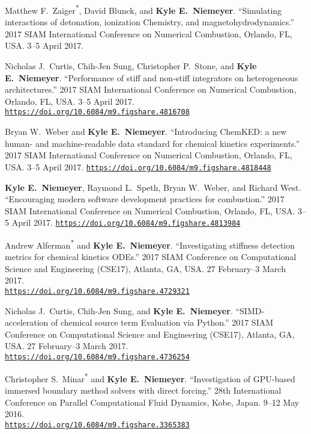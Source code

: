 \documentclass[margin,line,11pt]{res}
\makeatletter
\newlength{\bibhang}
\newlength{\bibsep}
 {\@listi \global\bibsep\itemsep \global\advance\bibsep by\parsep}
\newenvironment{bibenum*}
  {\renewcommand\labelenumi{\theenumi.}%
   \etaremune[
     topsep=0pt,
     itemsep=\bibsep,
     parsep=0pt,partopsep=0pt,
     itemindent=-\bibhang,
     leftmargin={\bibhang+\widthof{[999]}}]}
  {\endetaremune}
\newcommand*{\doi}[1]{\href{https://doi.org/#1}{\nolinkurl{https://doi.org/#1}}}
\newcommand*{\grad}[0]{\textsuperscript{*}}
\makeatother
\begin{document}
\begin{resume}
\begin{bibenum*}
\item Matthew F.~Zaiger\grad{}, David Blunck, and \textbf{Kyle E.~Niemeyer}.
``Simulating interactions of detonation, ionization Chemistry, and magnetohydrodynamics.''
2017 SIAM International Conference on Numerical Combustion, Orlando, FL, USA.
3--5 April 2017.

\item Nicholas J.~Curtis, Chih-Jen Sung, Christopher P.~Stone, and \textbf{Kyle E.~Niemeyer}.
``Performance of stiff and non-stiff integrators on heterogeneous architectures.''
2017 SIAM International Conference on Numerical Combustion, Orlando, FL, USA.
3--5 April 2017.
\doi{10.6084/m9.figshare.4816708}

\item Bryan W.~Weber and \textbf{Kyle E.~Niemeyer}.
``Introducing ChemKED: a new human- and machine-readable data standard for chemical kinetics experiments.''
2017 SIAM International Conference on Numerical Combustion, Orlando, FL, USA.
3--5 April 2017.
\doi{10.6084/m9.figshare.4818448}

\item \textbf{Kyle E.~Niemeyer}, Raymond L.~Speth, Bryan W.~Weber, and Richard West.
``Encouraging modern software development practices for combustion.''
2017 SIAM International Conference on Numerical Combustion, Orlando, FL, USA.
3--5 April 2017.
\doi{10.6084/m9.figshare.4813984}

\item Andrew Alferman\textsuperscript{*} and \textbf{Kyle E.~Niemeyer}.
``Investigating stiffness detection metrics for chemical kinetics ODEs.''
2017 SIAM Conference on Computational Science and Engineering (CSE17), Atlanta, GA, USA.
27 February--3 March 2017. \\
\doi{10.6084/m9.figshare.4729321}

\item Nicholas J.~Curtis, Chih-Jen Sung, and \textbf{Kyle E.~Niemeyer}.
``SIMD-acceleration of chemical source term Evaluation via Python.''
2017 SIAM Conference on Computational Science and Engineering (CSE17), Atlanta, GA, USA.
27 February--3 March 2017. \\
\doi{10.6084/m9.figshare.4736254}

\item Christopher S.~Minar\textsuperscript{*} and \textbf{Kyle E.~Niemeyer}.
``Investigation of GPU-based immersed boundary method solvers with direct forcing.''
28th International Conference on Parallel Computational Fluid Dynamics, Kobe, Japan.
9--12 May 2016. \\
\doi{10.6084/m9.figshare.3365383}


\end{bibenum*}
\end{resume}
\end{document}
